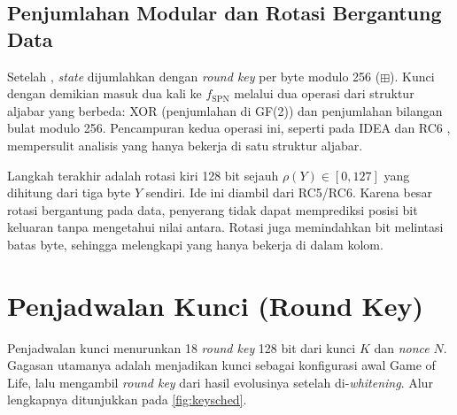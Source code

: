 \subsection{Penjumlahan Modular dan Rotasi Bergantung Data}
Setelah , \textit{state} dijumlahkan dengan \textit{round key} per byte modulo 256 ($\boxplus$). Kunci dengan demikian masuk dua kali ke $f_{\text{SPN}}$ melalui dua operasi dari struktur aljabar yang berbeda: XOR (penjumlahan di GF(2)) dan penjumlahan bilangan bulat modulo 256. Pencampuran kedua operasi ini, seperti pada IDEA dan RC6 \cite{rivest1998}, mempersulit analisis yang hanya bekerja di satu struktur aljabar.

Langkah terakhir adalah rotasi kiri 128 bit sejauh $\rho(Y) \in [0, 127]$ yang dihitung dari tiga byte $Y$ sendiri. Ide ini diambil dari RC5/RC6. Karena besar rotasi bergantung pada data, penyerang tidak dapat memprediksi posisi bit keluaran tanpa mengetahui nilai antara. Rotasi juga memindahkan bit melintasi batas byte, sehingga melengkapi  yang hanya bekerja di dalam kolom.

\section{Penjadwalan Kunci (Round Key)}
\label{sec:keysched}
Penjadwalan kunci menurunkan 18 \textit{round key} 128 bit dari kunci $K$ dan \textit{nonce} $N$. Gagasan utamanya adalah menjadikan kunci sebagai konfigurasi awal Game of Life, lalu mengambil \textit{round key} dari hasil evolusinya setelah di-\textit{whitening}. Alur lengkapnya ditunjukkan pada \cref{fig:keysched}.

